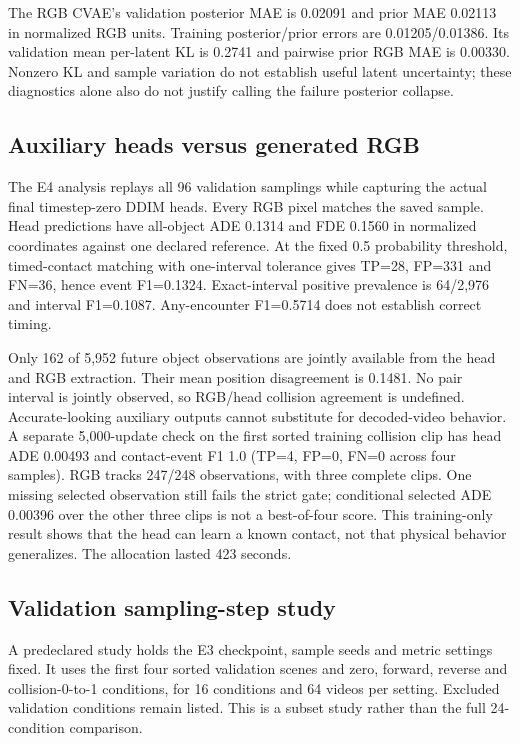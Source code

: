 \documentclass[11pt,a4paper]{article}
\begin{document}
The RGB CVAE's validation posterior MAE is 0.02091 and prior MAE 0.02113 in normalized RGB units. Training posterior/prior errors are 0.01205/0.01386. Its validation mean per-latent KL is 0.2741 and pairwise prior RGB MAE is 0.00330. Nonzero KL and sample variation do not establish useful latent uncertainty; these diagnostics alone also do not justify calling the failure posterior collapse.

\subsection{Auxiliary heads versus generated RGB}
The E4 analysis replays all 96 validation samplings while capturing the actual final timestep-zero DDIM heads. Every RGB pixel matches the saved sample. Head predictions have all-object ADE 0.1314 and FDE 0.1560 in normalized coordinates against one declared reference. At the fixed 0.5 probability threshold, timed-contact matching with one-interval tolerance gives TP=28, FP=331 and FN=36, hence event F1=0.1324. Exact-interval positive prevalence is 64/2,976 and interval F1=0.1087. Any-encounter F1=0.5714 does not establish correct timing.

Only 162 of 5,952 future object observations are jointly available from the head and RGB extraction. Their mean position disagreement is 0.1481. No pair interval is jointly observed, so RGB/head collision agreement is undefined. Accurate-looking auxiliary outputs cannot substitute for decoded-video behavior. A separate 5,000-update check on the first sorted training collision clip has head ADE 0.00493 and contact-event F1 1.0 (TP=4, FP=0, FN=0 across four samples). RGB tracks 247/248 observations, with three complete clips. One missing selected observation still fails the strict gate; conditional selected ADE 0.00396 over the other three clips is not a best-of-four score. This training-only result shows that the head can learn a known contact, not that physical behavior generalizes. The allocation lasted 423 seconds.

\subsection{Validation sampling-step study}
A predeclared study holds the E3 checkpoint, sample seeds and metric settings fixed. It uses the first four sorted validation scenes and zero, forward, reverse and collision-0-to-1 conditions, for 16 conditions and 64 videos per setting. Excluded validation conditions remain listed. This is a subset study rather than the full 24-condition comparison.
\end{document}
